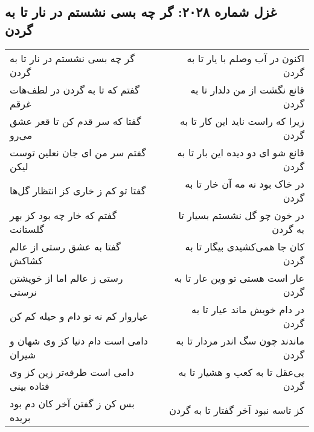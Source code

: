 \begin{center}
\section*{غزل شماره ۲۰۲۸: گر چه بسی نشستم در نار تا به گردن}
\label{sec:2028}
\begin{longtable}{l p{0.5cm} r}
گر چه بسی نشستم در نار تا به گردن
&&
اکنون در آب وصلم با یار تا به گردن
\\
گفتم که تا به گردن در لطف‌هات غرقم
&&
قانع نگشت از من دلدار تا به گردن
\\
گفتا که سر قدم کن تا قعر عشق می‌رو
&&
زیرا که راست ناید این کار تا به گردن
\\
گفتم سر من ای جان نعلین توست لیکن
&&
قانع شو ای دو دیده این بار تا به گردن
\\
گفتا تو کم ز خاری کز انتظار گل‌ها
&&
در خاک بود نه مه آن خار تا به گردن
\\
گفتم که خار چه بود کز بهر گلستانت
&&
در خون چو گل نشستم بسیار تا به گردن
\\
گفتا به عشق رستی از عالم کشاکش
&&
کان جا همی‌کشیدی بیگار تا به گردن
\\
رستی ز عالم اما از خویشتن نرستی
&&
عار است هستی تو وین عار تا به گردن
\\
عیاروار کم نه تو دام و حیله کم کن
&&
در دام خویش ماند عیار تا به گردن
\\
دامی است دام دنیا کز وی شهان و شیران
&&
ماندند چون سگ اندر مردار تا به گردن
\\
دامی است طرفه‌تر زین کز وی فتاده بینی
&&
بی‌عقل تا به کعب و هشیار تا به گردن
\\
بس کن ز گفتن آخر کان دم بود بریده
&&
کز تاسه نبود آخر گفتار تا به گردن
\\
\end{longtable}
\end{center}
